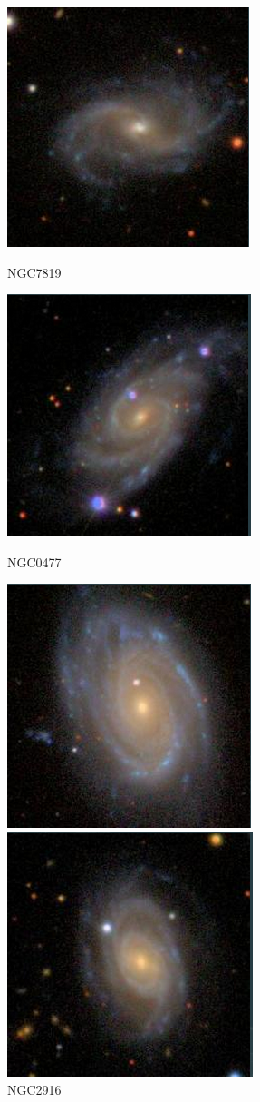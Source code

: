 \documentclass[9pt]{revtex4-1}
\begin{document}
\begin{figure}[h]
\includegraphics[scale=0.3]{NGC7819.png}
\caption{NGC7819}
\includegraphics[scale=0.3]{NGC0477.png}
\caption{NGC0477}
\includegraphics[scale=0.3]{NGC2916.png}
\caption{NGC2916}
\includegraphics[scale=0.3]{NGC7321.png}

\end{figure}
\end{document}
